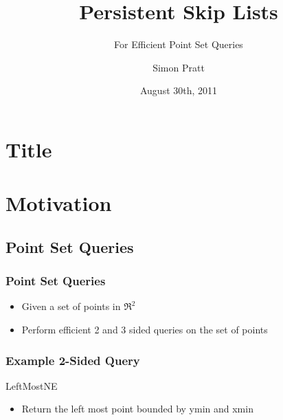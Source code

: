 \documentclass{beamer}
\title{Persistent Skip Lists}
\subtitle{For Efficient Point Set Queries}
\author{Simon Pratt}
\institute[Carleton University]
{
  Carleton University
}
\date{August 30th, 2011}
\begin{document}
\section{Title}
\begin{frame}
  \titlepage
\end{frame}




\section{Motivation}

\subsection{Point Set Queries}

\begin{frame}
  \frametitle{Point Set Queries}

  \begin{itemize}
  \item
    Given a set of points in $\Re^2$
  \item
    Perform efficient 2 and 3 sided queries on the set of points
  \end{itemize}
\end{frame}

\begin{frame}
  \frametitle{Example 2-Sided Query}

  LeftMostNE

  \begin{itemize}
  \item
    Return the left most point bounded by ymin and xmin
  \end{itemize}

\end{frame}
\end{document}
